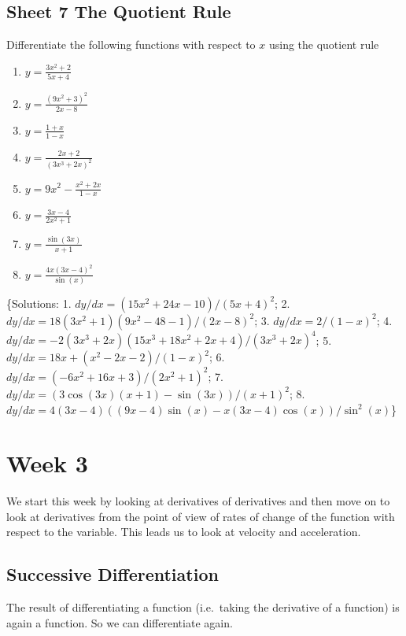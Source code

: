 \documentclass[
  english,
  11pt,
  oneside]{book}
\providecommand{\tightlist}{%
  \setlength{\itemsep}{0pt}\setlength{\parskip}{0pt}}
\newcommand{\slide}{}
\theoremstyle{definition}
\theoremstyle{definition}
\theoremstyle{definition}
\theoremstyle{definition}
\theoremstyle{remark}
\begin{document}
\section{Sheet 7 The Quotient Rule}\label{sheet-7-the-quotient-rule}

Differentiate the following functions with respect to \(x\) using the quotient rule

\begin{enumerate}
\def\labelenumi{\arabic{enumi}.}
\tightlist
\item
  \(y=\frac{3x^2+2}{5x+4}\)
\item
  \(y=\frac{(9x^2+3)^2}{2x-8}\)
\item
  \(y=\frac{1+x}{1-x}\)
\item
  \(y=\frac{2x+2}{(3x^3+2x)^2}\)
\item
  \(y=9x^2-\frac{x^2+2x}{1-x}\)
\item
  \(y=\frac{3x-4}{2x^2+1}\)
\item
  \(y=\frac{\sin(3x)}{x+1}\)
\item
  \(y=\frac{4x(3x-4)^2}{\sin(x)}\)
\end{enumerate}

\slide

\{Solutions: 1. \(dy/dx = (15x^2+24x-10)/(5x+4)^2\); 2. \(dy/dx = 18(3x^2+1)(9x^2-48-1)/(2x-8)^2\); 3. \(dy/dx = 2/(1-x)^2\); 4. \(dy/dx = -2(3x^3+2x)(15x^3+18x^2+2x+4)/(3x^3+2x)^4\); 5. \(dy/dx = 18x+(x^2-2x-2)/(1-x)^2\); 6. \(dy/dx = (-6x^2+16x+3)/(2x^2+1)^2\); 7. \(dy/dx = (3\cos(3x)(x+1)-\sin(3x))/(x+1)^2\); 8. \(dy/dx = 4(3x-4)((9x-4)\sin(x)-x(3x-4)\cos(x))/\sin^2(x)\)\}

\chapter{Week 3}\label{week-three}

We start this week by looking at derivatives of derivatives and then move on to look at derivatives from the point of view of rates of change of the function with respect to the variable. This leads us to look at velocity and acceleration.
\slide

\section{Successive Differentiation}\label{lecture-seven}

The result of differentiating a function (i.e.~taking the derivative of a function) is again a function. So we can differentiate again.
\end{document}

